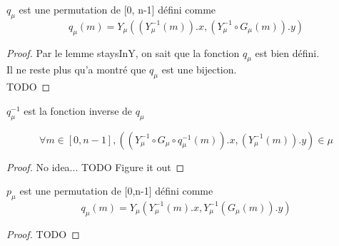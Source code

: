 \begin{definition}[qu]
    \label{qu}
    \leanok
    $q_{\mu}$ est une permutation de [0, n-1] défini comme
    \[ q_{\mu}(m)= Y_{\mu}((Y_{\mu}^{-1}(m)).x,(Y_{\mu}^{-1} \circ G_{\mu}(m)).y) \]
\end{definition}
\begin{proof}
    \leanok
    Par le lemme staysInY, on sait que la fonction $q_{\mu}$ est bien défini.\\
    Il ne reste plus qu'a montré que $q_{\mu}$ est une bijection.\\
    TODO
\end{proof}

\begin{definition}[quInv]
    \label{quInv}
    \leanok
    $q_{\mu}^{-1}$ est la fonction inverse de $q_{\mu}$
\end{definition}

\begin{lemma}[staysInX]
    \label{staysInX}
    \[ \forall m \in [0,n-1], ((Y_{\mu}^{-1} \circ G_{\mu} \circ q_{\mu}^{-1}(m)).x, (Y_{\mu}^{-1}(m)).y) \in \mu \]
\end{lemma}
\begin{proof}
    No idea...
    TODO Figure it out
\end{proof}

\begin{definition}[pu]
    \label{pu}
    $p_{\mu}$ est une permutation de [0,n-1] défini comme
    \[ q_{\mu}(m)= Y_{\mu}(Y_{\mu}^{-1}(m).x,Y_{\mu}^{-1}(G_{\mu}(m)).y) \]
\end{definition}
\begin{proof}
    TODO
    
\end{proof}

